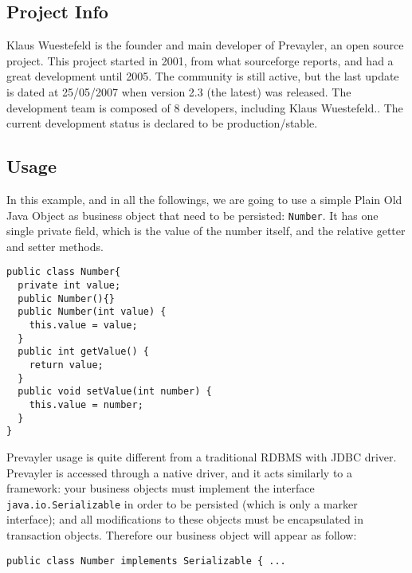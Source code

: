 			\subsection{Project Info}
			Klaus Wuestefeld is the founder and main developer of Prevayler, an open source project. This project 
			started in 2001, from what sourceforge reports, and had a great development until 2005. 
			The community is still active, but the 
			last update is dated at 25/05/2007 when version 2.3 (the latest) was released. The development team is composed 
			of 8 developers, including Klaus Wuestefeld.. The current development status is declared to be production/stable.	
			
			\subsection{Usage}
			In this example, and in all the followings, we are going to use a simple Plain Old 
			Java Object as business object that need to be persisted: \lstinline!Number!. It has one single 
			private field, which is the value of the number itself, and the relative getter and 
			setter methods.
			\begin{lstlisting}[caption={Implementation of the object Number},label={number-object}] 
public class Number{
  private int value;	
  public Number(){}	
  public Number(int value) {
    this.value = value;
  }
  public int getValue() {
    return value;
  }
  public void setValue(int number) {
    this.value = number;
  }	
}
   		\end{lstlisting} 
			
			Prevayler usage is quite different from a traditional RDBMS with JDBC driver. Prevayler is accessed 
			through a native driver, and it acts similarly to a framework: your business objects must implement 
			the interface \lstinline!java.io.Serializable! in order to be persisted (which is only a marker interface); 
			and all modifications to these objects must be encapsulated in transaction objects. Therefore our 
			business object will appear as follow:	
			\begin{lstlisting} 
public class Number implements Serializable { ...
   		\end{lstlisting} 		
			
